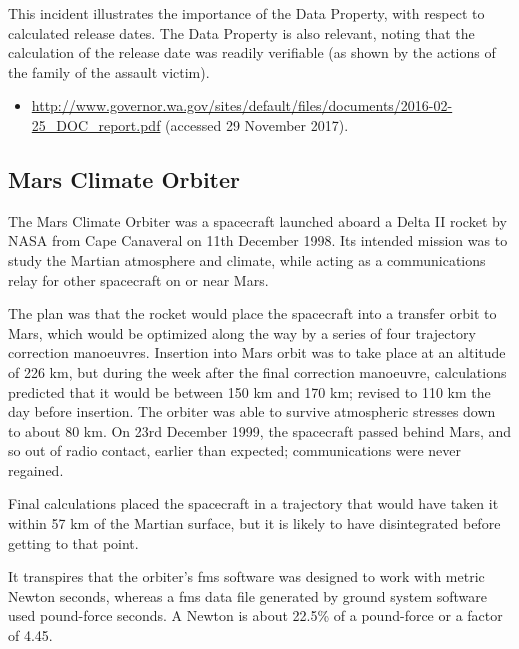 This incident illustrates the importance of the  Data Property, with respect to calculated release dates. The  Data Property is also relevant, noting that the calculation of the release date was readily verifiable (as shown by the actions of the family of the assault victim).

\begin{samepage}
\begin{itemize}
	\item \raggedright{\href{http://www.governor.wa.gov/sites/default/files/documents/2016-02-25_DOC_report.pdf}{http://www.governor.wa.gov/sites/default/files/documents/2016-02-25\_DOC\_report.pdf} (accessed 29 November 2017).}
\end{itemize}
\end{samepage}


\subsection{Mars Climate Orbiter} \label{bkm:incacc:marsclimate}
The Mars Climate Orbiter was a spacecraft launched aboard a Delta II rocket by NASA from Cape Canaveral on 11th December 1998. Its intended mission was to study the Martian atmosphere and climate, while acting as a communications relay for other spacecraft on or near Mars.

The plan was that the rocket would place the spacecraft into a transfer orbit to Mars, which would be optimized along the way by a series of four trajectory correction manoeuvres. Insertion into Mars orbit was to take place at an altitude of 226 km, but during the week after the final correction manoeuvre, calculations predicted that it would be between 150 km and 170 km; revised to 110 km the day before insertion. The orbiter was able to survive atmospheric stresses down to about 80 km. On 23rd December 1999, the spacecraft passed behind Mars, and so out of radio contact, earlier than expected; communications were never regained.

Final calculations placed the spacecraft in a trajectory that would have taken it within 57 km of the Martian surface, but it is likely to have disintegrated before getting to that point. 

It transpires that the orbiter's \gls{fms} software was designed to work with metric Newton seconds, whereas a \gls{fms} \cbstart \cbstart data file \cbend generated by ground system software used pound-force seconds. A Newton is about 22.5\% of a pound-force or a factor of 4.45.

